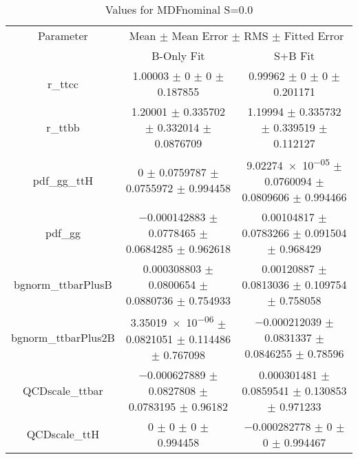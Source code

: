 \begin{table}
\centering
\caption{Values for MDFnominal S=0.0}
\begin{tabular}{ccc}
\toprule
Parameter & \multicolumn{2}{c}{Mean $\pm$ Mean Error $\pm$ RMS $\pm$ Fitted Error}\\
 & B-Only Fit & S+B Fit\\
\midrule
r\_ttcc & \num{1.00003} $\pm$ \num{0} $\pm$ \num{0} $\pm$ \num{0.187855} & \num{0.99962} $\pm$ \num{0} $\pm$ \num{0} $\pm$ \num{0.201171}\\
r\_ttbb & \num{1.20001} $\pm$ \num{0.335702} $\pm$ \num{0.332014} $\pm$ \num{0.0876709} & \num{1.19994} $\pm$ \num{0.335732} $\pm$ \num{0.339519} $\pm$ \num{0.112127}\\
pdf\_gg\_ttH & \num{0} $\pm$ \num{0.0759787} $\pm$ \num{0.0755972} $\pm$ \num{0.994458} & \num{9.02274e-05} $\pm$ \num{0.0760094} $\pm$ \num{0.0809606} $\pm$ \num{0.994466}\\
pdf\_gg & \num{-0.000142883} $\pm$ \num{0.0778465} $\pm$ \num{0.0684285} $\pm$ \num{0.962618} & \num{0.00104817} $\pm$ \num{0.0783266} $\pm$ \num{0.091504} $\pm$ \num{0.968429}\\
bgnorm\_ttbarPlusB & \num{0.000308803} $\pm$ \num{0.0800654} $\pm$ \num{0.0880736} $\pm$ \num{0.754933} & \num{0.00120887} $\pm$ \num{0.0813036} $\pm$ \num{0.109754} $\pm$ \num{0.758058}\\
bgnorm\_ttbarPlus2B & \num{3.35019e-06} $\pm$ \num{0.0821051} $\pm$ \num{0.114486} $\pm$ \num{0.767098} & \num{-0.000212039} $\pm$ \num{0.0831337} $\pm$ \num{0.0846255} $\pm$ \num{0.78596}\\
QCDscale\_ttbar & \num{-0.000627889} $\pm$ \num{0.0827808} $\pm$ \num{0.0783195} $\pm$ \num{0.96182} & \num{0.000301481} $\pm$ \num{0.0859541} $\pm$ \num{0.130853} $\pm$ \num{0.971233}\\
QCDscale\_ttH & \num{0} $\pm$ \num{0} $\pm$ \num{0} $\pm$ \num{0.994458} & \num{-0.000282778} $\pm$ \num{0} $\pm$ \num{0} $\pm$ \num{0.994467}\\
\bottomrule
\end{tabular}
\end{table}